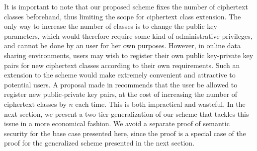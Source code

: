 It is important to note that our proposed scheme fixes the number of ciphertext classes beforehand, thus limiting the scope for ciphertext class extension. The only way to increase the number of classes is to change the public key parameters, which would therefore require some kind of administrative privileges, and cannot be done by an user for her own purposes. However, in online data sharing environments, users may wish to register their own public key-private key pairs for new ciphertext classes according to their own requirements. Such an extension to the scheme would make extremely convenient and attractive to potential users. A proposal made in \cite{chu2014key} recommends that the user be allowed to register new public-private key pairs, at the cost of increasing the number of ciphertext classes by $n$ each time. This is both impractical and wasteful. In the next section, we present a two-tier generalization of our scheme that tackles this issue in a more economical fashion. We avoid a separate proof of semantic security for the base case presented here, since the proof is a special case of the proof for the generalized scheme presented in the next section.  
  


